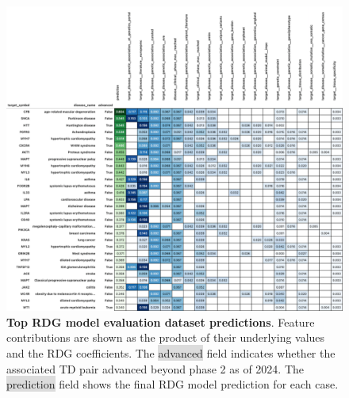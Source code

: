 \documentclass{article}
\begin{document}
\pagebreak

\begin{figure}[H]
  \centering
  \captionsetup{width=.9\linewidth}
  \includegraphics[width=1\textwidth]{top_evaluation_predictions.png}
  \caption{
    \textbf{Top RDG model evaluation dataset predictions}.
    Feature contributions are shown as the product of their underlying values and the RDG coefficients. The \colorbox{Gainsboro}{advanced} field indicates whether the associated TD pair advanced beyond phase 2 as of 2024. The \colorbox{Gainsboro}{prediction} field shows the final RDG model prediction for each case.
  }
  \label{fig:top_evaluation_predictions}
\end{figure}

\clearpage
\end{document}
